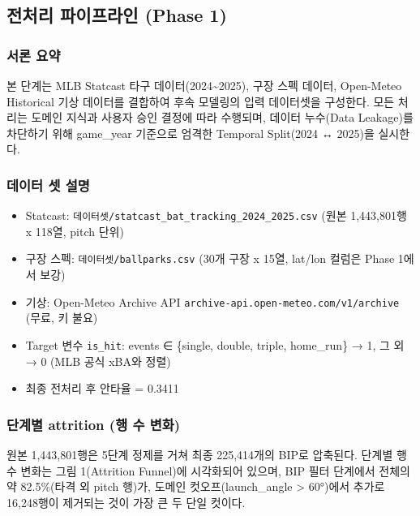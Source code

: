 \documentclass[
  11.5pt,
]{article}
\providecommand{\tightlist}{%
  \setlength{\itemsep}{0pt}\setlength{\parskip}{0pt}}
\begin{document}
\subsection{전처리 파이프라인 (Phase
1)}\label{uxc804uxcc98uxb9ac-uxd30cuxc774uxd504uxb77cuxc778-phase-1}

\subsubsection{서론 요약}\label{uxc11cuxb860-uxc694uxc57d}

본 단계는 MLB Statcast 타구 데이터(2024\textasciitilde2025), 구장 스펙
데이터, Open-Meteo Historical 기상 데이터를 결합하여 후속 모델링의 입력
데이터셋을 구성한다. 모든 처리는 도메인 지식과 사용자 승인 결정에 따라
수행되며, 데이터 누수(Data Leakage)를 차단하기 위해 game\_year 기준으로
엄격한 Temporal Split(2024 ↔ 2025)을 실시한다.

\subsubsection{데이터 셋
설명}\label{uxb370uxc774uxd130-uxc14b-uxc124uxba85}

\begin{itemize}
\tightlist
\item
  Statcast: \texttt{데이터셋/statcast\_bat\_tracking\_2024\_2025.csv}
  (원본 1,443,801행 x 118열, pitch 단위)
\item
  구장 스펙: \texttt{데이터셋/ballparks.csv} (30개 구장 x 15열, lat/lon
  컬럼은 Phase 1에서 보강)
\item
  기상: Open-Meteo Archive API
  \texttt{archive-api.open-meteo.com/v1/archive} (무료, 키 불요)
\item
  Target 변수 \texttt{is\_hit}: events ∈ \{single, double, triple,
  home\_run\} → 1, 그 외 → 0 (MLB 공식 xBA와 정렬)
\item
  최종 전처리 후 안타율 = 0.3411
\end{itemize}

\subsubsection{단계별 attrition (행 수
변화)}\label{uxb2e8uxacc4uxbcc4-attrition-uxd589-uxc218-uxbcc0uxd654}

원본 1,443,801행은 5단계 정제를 거쳐 최종 225,414개의 BIP로 압축된다.
단계별 행 수 변화는 그림 1(Attrition Funnel)에 시각화되어 있으며, BIP
필터 단계에서 전체의 약 82.5\%(타격 외 pitch 행)가, 도메인
컷오프(\textbar launch\_angle\textbar{} \textgreater{} 60°)에서 추가로
16,248행이 제거되는 것이 가장 큰 두 단일 컷이다.
\end{document}
